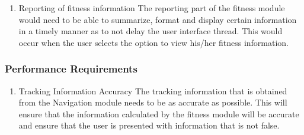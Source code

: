 \begin{enumerate}
\item Reporting of fitness information
	\newline
The reporting part of the fitness module would need to be able to summarize, format and display certain information in a timely manner as to not delay the user interface thread. This would occur when the user selects the option to view his/her fitness information.

\end{enumerate}

\subsubsection{Performance Requirements}
\begin{enumerate}
	\item Tracking Information Accuracy
	\newline
	The tracking information that is obtained from the Navigation module needs to be as accurate as possible. This will ensure that the information calculated by the fitness module will be accurate and ensure that the user is presented with information that is not false.
\end{enumerate}



